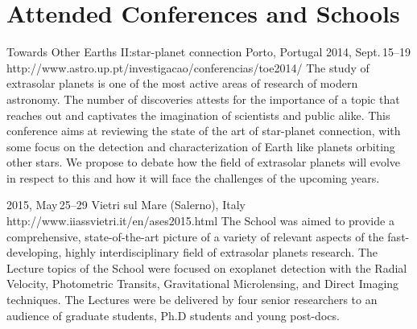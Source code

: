 \section{Attended Conferences and Schools}\label{app_sec:conferences}

{Towards Other Earths II:\@The star-planet connection}%
{Porto, Portugal}%
{2014, Sept.\,15--19}%
{http://www.astro.up.pt/investigacao/conferencias/toe2014/}%
{}%
{The study of extrasolar planets is one of the most active areas of research of modern astronomy.
The number of discoveries attests for the importance of a topic that reaches out and captivates the imagination of scientists and public alike.
This conference aims at reviewing the state of the art of star-planet connection, with some focus on the detection and characterization of Earth like planets orbiting other stars.
We propose to debate how the field of extrasolar planets will evolve in respect to this and how it will face the challenges of the upcoming years.}%

{2015, May\,25--29}%
{Vietri sul Mare (Salerno), Italy}%
{http://www.iiassvietri.it/en/ases2015.html}%
{}%
{The School was aimed to provide a comprehensive, state-of-the-art picture of a variety of relevant aspects of the fast-developing, highly interdisciplinary field of extrasolar planets research.
The Lecture topics of the School were focused on exoplanet detection with the Radial Velocity, Photometric Transits, Gravitational Microlensing, and Direct Imaging techniques.
The Lectures were be delivered by four senior researchers to an audience of graduate students, Ph.D students and young post-docs.}%

